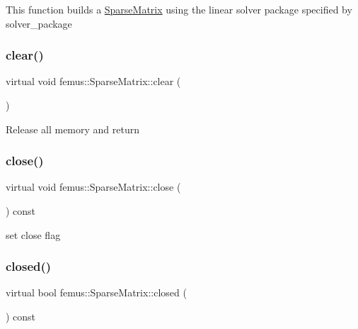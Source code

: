 This function builds a \mbox{\hyperlink{classfemus_1_1_sparse_matrix}{Sparse\+Matrix}} using the linear solver package specified by solver\+\_\+package \mbox{\label{classfemus_1_1_sparse_matrix_aa737406132c93b1ea7e6684c4c8b6fa4}} 
\subsubsection{\texorpdfstring{clear()}{clear()}}
{\footnotesize\ttfamily virtual void femus\+::\+Sparse\+Matrix\+::clear (\begin{DoxyParamCaption}{ }\end{DoxyParamCaption})\hspace{0.3cm}{\ttfamily [pure virtual]}}

Release all memory and return \mbox{\label{classfemus_1_1_sparse_matrix_a6eb9fbd88830b0d10c88f0ce066b07ae}} 
\subsubsection{\texorpdfstring{close()}{close()}}
{\footnotesize\ttfamily virtual void femus\+::\+Sparse\+Matrix\+::close (\begin{DoxyParamCaption}{ }\end{DoxyParamCaption}) const\hspace{0.3cm}{\ttfamily [pure virtual]}}

set close flag \mbox{\label{classfemus_1_1_sparse_matrix_a2f6f30b675a1afe8b78473c5f6ad59dc}} 
\subsubsection{\texorpdfstring{closed()}{closed()}}
{\footnotesize\ttfamily virtual bool femus\+::\+Sparse\+Matrix\+::closed (\begin{DoxyParamCaption}{ }\end{DoxyParamCaption}) const\hspace{0.3cm}{\ttfamily [pure virtual]}}

